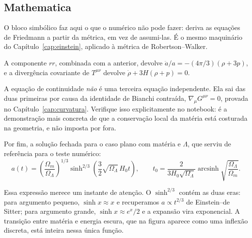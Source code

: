 \subsection{Mathematica}


O bloco simbólico faz aqui o que o numérico não pode fazer: deriva as
equações de Friedmann a partir da métrica, em vez de assumi-las. É o mesmo
maquinário do Capítulo~\ref{cap:einstein}, aplicado à métrica de
Robertson--Walker.

A componente $rr$, combinada com a anterior, devolve
$\ddot a/a = -(4\pi/3)(\rho + 3p)$, e a divergência covariante de $T^{\mu\nu}$
devolve $\dot\rho + 3H(\rho + p) = 0$.

\begin{central}
A equação de continuidade \emph{não} é uma terceira equação independente.
Ela sai das duas primeiras por causa da identidade de Bianchi contraída,
$\nabla_{\mu}G^{\mu\nu} = 0$, provada no Capítulo~\ref{cap:curvatura}. Verifique isso explicitamente no notebook: é a demonstração mais concreta de que a conservação local da matéria está costurada na geometria, e não imposta por fora.
\end{central}

Por fim, a solução fechada para o caso plano com matéria e $\Lambda$, que
serviu de referência para o teste numérico:
\begin{equation}
  a(t) = \left(\frac{\Omega_{m}}{\Omega_{\Lambda}}\right)^{1/3}
         \sinh^{2/3}\!\left(\frac{3}{2}\sqrt{\Omega_{\Lambda}}\,H_{0}t\right),
  \qquad
  t_{0} = \frac{2}{3H_{0}\sqrt{\Omega_{\Lambda}}}
          \operatorname{arcsinh}\sqrt{\frac{\Omega_{\Lambda}}{\Omega_{m}}}.
  \label{eq:cap13-sinh}
\end{equation}

Essa expressão merece um instante de atenção. O $\sinh^{2/3}$ contém as
duas eras: para argumento pequeno, $\sinh x \approx x$ e recuperamos
$a \propto t^{2/3}$ de Einstein--de Sitter; para argumento grande,
$\sinh x \approx e^{x}/2$ e a expansão vira exponencial. A transição entre
matéria e energia escura, que na figura aparece como uma inflexão discreta,
está inteira nessa única função.

